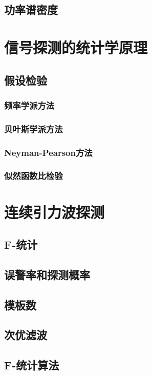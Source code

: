 \subsection{功率谱密度}

\section{信号探测的统计学原理}
\subsection{假设检验}
\subsubsection{频率学派方法}
\subsubsection{贝叶斯学派方法}
\subsubsection{Neyman-Pearson方法}
\subsubsection{似然函数比检验}

\section{连续引力波探测}
\subsection{F-统计}
\subsection{误警率和探测概率}
\subsection{模板数}
\subsection{次优滤波}
\subsection{F-统计算法}


